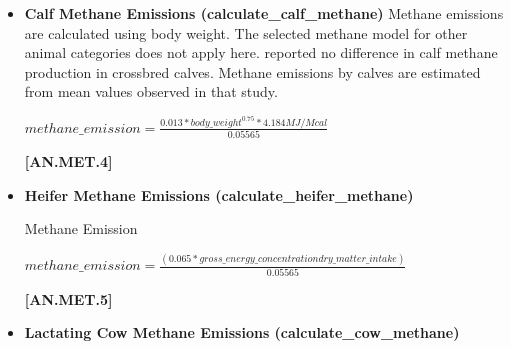 \begin{refsection}
\begin{itemize}
    \begin{center}
        \(starch\_to\_acid\_detergent\_fiber\_concentration\_ratio = -0.0011 * \frac{starch\_concentration}{acid\_detergent\_fiber\_concentrations}\)
    \end{center}
        \vspace{0.5cm} 
    
            {\raggedleft \textbf{[AN.MET.3]}\par}
            \vspace{0.5cm}

        \item \textbf{Calf Methane Emissions (calculate\_calf\_methane)}
Methane emissions are calculated using body weight. The selected methane model for other animal categories does not apply here. \cite{Pattanaik2003} reported no difference in calf methane production in crossbred calves. Methane emissions by calves are estimated from mean values observed in that study.
            \vspace{0.5cm}
    
    \begin{center}
        \(methane\_emission = \frac{0.013 * body\_weight^{0.75} * 4.184 MJ/Mcal}{0.05565}\)
    \end{center}
        \vspace{0.5cm} 
    
            {\raggedleft \textbf{[AN.MET.4]}\par}
            \vspace{0.5cm}

        \item \textbf{Heifer Methane Emissions (calculate\_heifer\_methane)}

Methane Emission
            \vspace{0.5cm}
    
    \begin{center}
        \(methane\_emission = \frac{(0.065 * gross\_energy\_concentration dry\_matter\_intake)}{0.05565}\)
    \end{center}
        \vspace{0.5cm} 
    
            {\raggedleft \textbf{[AN.MET.5]}\par}
            \vspace{0.5cm}
            
        \item \textbf{Lactating Cow Methane Emissions (calculate\_cow\_methane)}


\end{itemize}
\end{refsection}
